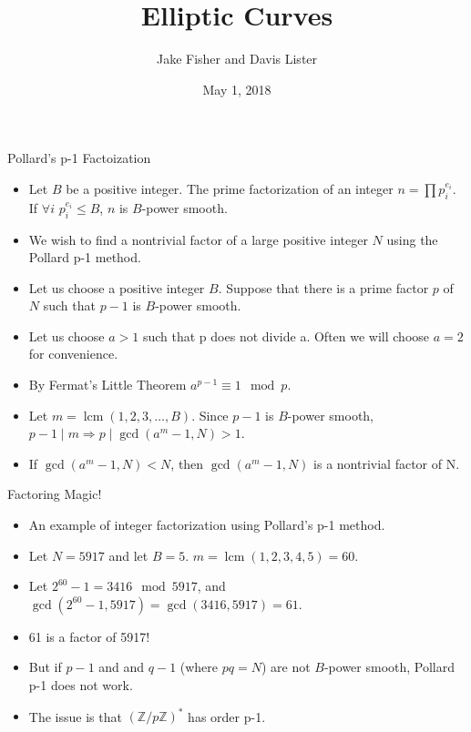 \documentclass{beamer}
\title{Elliptic Curves}
\author{Jake Fisher and Davis Lister}
\date{May 1, 2018}
\DeclareMathOperator{\lcm}{lcm}
\begin{document}
	
	\begin{frame}
		\titlepage
	\end{frame}
	
	\begin{frame}{Pollard's p-1 Factoization}
		\begin{itemize}
			\item Let $B$ be a positive integer. The prime factorization of an integer $n=\prod p_{i}^{e_{i}}$. If $\forall i$ $p_{i}^{e_{i}} \leq B$, $n$ is $B$-power smooth.
			\item We wish to find a nontrivial factor of a large positive integer $N$ using the Pollard p-1 method.
			\item Let us choose a positive integer $B$. Suppose that there is a prime factor $p$ of $N$ such that $p-1$ is $B$-power smooth.
			\item Let us choose $a > 1$ such that p does not divide a. Often we will choose $a=2$ for convenience.
			\item By Fermat's Little Theorem $a^{p-1} \equiv 1 \mod p$.
			\item Let $m = \lcm (1,2,3,\dotso,B)$. Since $p-1$ is $B$-power smooth, $p-1 \mid m \Longrightarrow p \mid \gcd (a^m-1,N) > 1$.
			\item If $\gcd (a^m-1,N) < N$, then $\gcd (a^m-1,N)$ is a nontrivial factor of N.
		\end{itemize}
	\end{frame}
	
	\begin{frame}{Factoring Magic!}
		\begin{itemize}
			\item An example of integer factorization using Pollard's p-1 method.
			\item Let $N=5917$ and let $B=5$. $m=\lcm (1,2,3,4,5)=60$.
			\item Let $2^{60}-1=3416 \mod 5917$, and $\gcd (2^{60}-1, 5917)=\gcd (3416, 5917)=61$.
			\item 61 is a factor of 5917!
			\item But if $p-1$ and and $q-1$ (where $pq=N$) are not $B$-power smooth, Pollard p-1 does not work.
			\item The issue is that $(\mathbb{Z}/p\mathbb{Z})^*$ has order p-1.
		\end{itemize}
	\end{frame}
	
\end{document}

